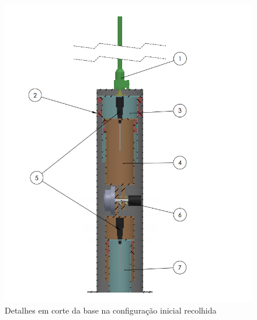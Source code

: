 \begin{figure}[h!]
\centering
	\includegraphics[width=\columnwidth]{figs/estudo/solid/base_recolhida} 
	\caption{Detalhes em corte da base na configuração inicial recolhida}
	\label{fig::base_recolhida}
\end{figure}

